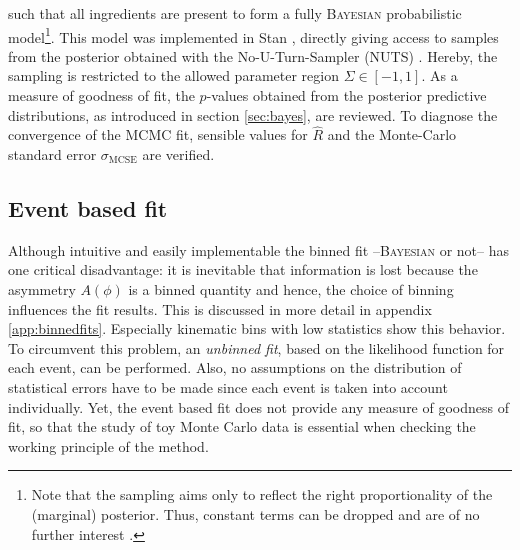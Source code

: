 such that all ingredients are present to form a fully \textsc{Bayesian} probabilistic model\footnote{Note that the sampling aims only to reflect the right proportionality of the (marginal) posterior. Thus, constant terms can be dropped and are of no further interest \cite{stan}.}. This model was implemented in Stan \cite{stan}, directly giving access to samples from the posterior obtained with the No-U-Turn-Sampler (NUTS) \cite{stan,nuts}. Hereby, the sampling is restricted to the allowed parameter region $\Sigma\in[-1,1]$. As a measure of goodness of fit, the $p$-values obtained from the posterior predictive distributions, as introduced in section \ref{sec:bayes}, are reviewed. To diagnose the convergence of the MCMC fit, sensible values for $\hat{R}$ and the Monte-Carlo standard error $\sigma_\text{MCSE}$ are verified.
\subsection{Event based fit}
Although intuitive and easily implementable the binned fit --\textsc{Bayesian} or not-- has one critical disadvantage: it is inevitable that information is lost because the asymmetry $A(\phi)$ is a binned quantity and hence, the choice of binning influences the fit results. This is discussed in more detail in appendix \ref{app:binnedfits}. Especially kinematic bins with low statistics show this behavior. To circumvent this problem, an \emph{unbinned fit}, based on the likelihood function for each event, can be performed. Also, no assumptions on the distribution of statistical errors have to be made since each event is taken into account individually. Yet, the event based fit does not provide any measure of goodness of fit, so that the study of toy Monte Carlo data is essential when checking the working principle of the method.

